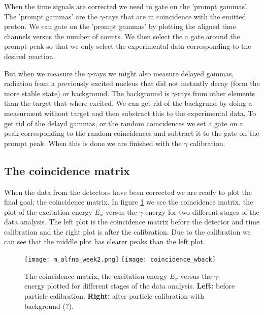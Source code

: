 \documentclass[11pt,a4wide]{article}
\begin{document}
When the time signals are corrected we need to gate on the 'prompt gammas'. The 'prompt gammas' are the $\gamma$-rays that are in coincidence with the emitted proton. We can gate on the 'prompt gammas' by plotting the aligned time channels versus the number of counts. We then select the a  gate around the prompt peak so that we only select the experimental data corresponding to the desired reaction. 

But when we measure the $\gamma$-rays we might also measure delayed gammas, radiation from a previously excited nucleus that did not instantly decay (form the more stable state) or background. The background is $\gamma$-rays from other elements than the target that where excited. We can get rid of the backgrund by doing a measurment without target and then substract this to the experimental data. To get rid of the delayd gammas, or the random coincidences we set a gate on a peak corresponding to the random coincidences and subtract it to the gate on the prompt peak. When this is done we are finished with the $\gamma$ calibration.


\subsection{ The coincidence matrix}
When the data from the detectors have been corrected we are ready to plot the final goal; the coincidence matrix. In figure \ref{fig: coincidence} we see the coincidence matrix, the plot of the excitation energy $E_x$ versus the $\gamma$-energy for two different stages of the data analysis. The left plot is the coincidence matrix before the detector and time calibration and the right plot is after the calibration. Due to the calibration we can see that the middle plot has clearer peaks than the left plot. 

\begin{figure}[htp]
\centering
\texttt{[image: m\_alfna\_week2.png]}
\texttt{[image: coincidence\_wback]}
\caption{The coincidence matrix, the excitation energy $E_x$ versus the $\gamma$-energy plotted for different stages of the data analysis. \textbf{Left:} before particle calibration. \textbf{Right:} after particle calibration with background (?). }%
\label{fig: coincidence}
\end{figure}
\end{document}
